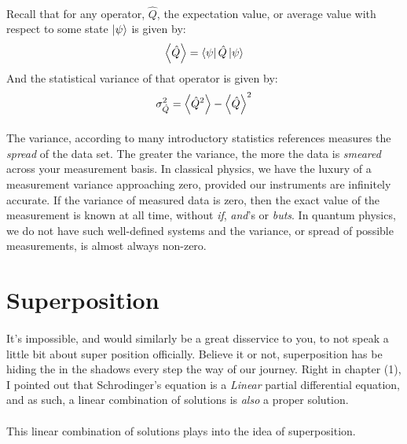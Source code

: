 \documentclass[12pt,letterpaper]{book}
\begin{document}
\paragraph*{}Recall that for any operator, 
$\hat{Q}$, the expectation value, or average value with respect to some state 
$\ket{\psi}$ is given by:
\begin{equation}
\expval{\hat{Q}} = \bra{\psi}\hat{Q}\ket{\psi}
\end{equation}
And the statistical variance of that operator is given by:
\begin{equation}
\sigma^{2}_{\hat{Q}} =  \expval{\hat{Q}^2} - \expval{\hat{Q}}^2
\end{equation}

\paragraph*{}The variance, according to many introductory statistics references measures the \textit{spread} of the data set. The greater the variance, the more the data is \textit{smeared} across your measurement basis. In classical physics, we have the luxury of a measurement variance approaching zero, provided our instruments are infinitely accurate. If the variance of measured data is zero, then the exact value of the measurement is known at all time, without \textit{if}, \textit{and}'s or \textit{buts}. In quantum physics, we do not have such well-defined systems and the variance, or spread of possible measurements, is almost always non-zero.



\section{Superposition}

\paragraph*{}It's impossible, and would similarly be a great disservice to you, to not speak a little bit about super position officially. Believe it or not, superposition has be hiding the in the shadows every step the way of our journey. Right in chapter (1), I pointed out that Schrodinger's equation is a \textit{Linear} partial differential equation, and as such, a linear combination of solutions is \textit{also} a proper solution.

\paragraph*{}This linear combination of solutions plays into the idea of superposition. 
\end{document}
